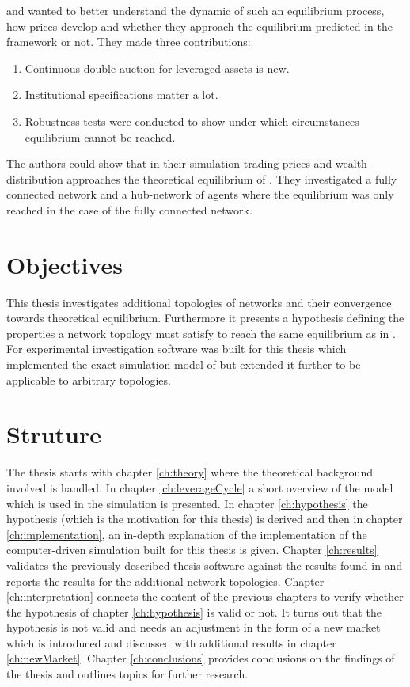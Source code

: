 \documentclass[Bachelorarbeit.tex]{subfiles}
\begin{document}
and wanted to better understand the dynamic of such an equilibrium process, how prices develop and whether they approach the equilibrium predicted in the framework or not. They made three contributions:

\begin{enumerate}
\item Continuous double-auction for leveraged assets is new.
\item Institutional specifications matter a lot.
\item Robustness tests were conducted to show under which circumstances equilibrium cannot be reached.
\end{enumerate}

The authors could show that in their simulation trading prices and wealth-distribution approaches the theoretical equilibrium of \cite{Geanakoplos2009}. They investigated a fully connected network and a hub-network of agents where the equilibrium was only reached in the case of the fully connected network. 

\section{Objectives}
This thesis investigates additional topologies of networks and their convergence towards theoretical equilibrium. Furthermore it presents a hypothesis defining the properties a network topology must satisfy to reach the same equilibrium as in \cite{Breuer2015}. For experimental investigation software was built for this thesis which implemented the exact simulation model of \cite{Breuer2015} but extended it further to be applicable to arbitrary topologies.

\section{Struture}
The thesis starts with chapter \ref{ch:theory} where the theoretical background involved is handled. In chapter \ref{ch:leverageCycle} a short overview of the model which is used in the simulation is presented. In chapter \ref{ch:hypothesis} the hypothesis (which is the motivation for this thesis) is derived and then in chapter \ref{ch:implementation}, an in-depth explanation of the implementation of the computer-driven simulation built for this thesis is given. Chapter \ref{ch:results} validates the previously described thesis-software against the results found in \cite{Breuer2015} and reports the results for the additional network-topologies. Chapter \ref{ch:interpretation} connects the content of the previous chapters to verify whether the hypothesis of chapter \ref{ch:hypothesis} is valid or not. It turns out that the hypothesis is not valid and needs an adjustment in the form of a new market which is introduced and discussed with additional results in chapter \ref{ch:newMarket}. Chapter \ref{ch:conclusions} provides conclusions on the findings of the thesis and outlines topics for further research.
\end{document}
